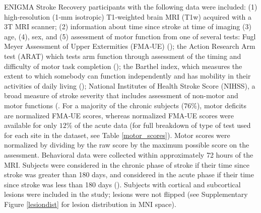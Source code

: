 \documentclass[10pt]{article}
\begin{document}
ENIGMA Stroke Recovery participants with the following data were included: (1) high‐resolution (1‐mm isotropic) T1‐weighted brain MRI (T1w) acquired with a 3T MRI scanner; (2) information about time since stroke at time of imaging (3) age, (4), sex, and (5) assessment of motor function from one of several tests: Fugl Meyer Assessment of Upper Extermities (FMA‐UE) (\cite{Gladstone2002-fw}); the Action Research Arm test (ARAT) which tests arm function through assessment of the timing and difficulty of motor task completion (\cite{Yozbatiran2008-xv}); the Barthel index, which measures the extent to which somebody can function independently and has mobility in their activities of daily living (\cite{Sulter1999-rr}); National Institutes of Health Stroke Score (NIHSS), a broad measure of stroke severity that includes assessment of non-motor and motor functions (\cite{Lyden2017-za}. For a majority of the chronic subjects (76$\%$), motor deficits are normalized FMA‐UE scores, whereas  normalized FMA‐UE scores were available for only $12\%$ of the acute data (for full breakdown of type of test used for each site in the dataset, see Table \ref{motor_scores}). Motor scores were normalized by dividing by the raw score by the maximum possible score on the assessment. Behavioral data were collected within approximately 72 hours of the MRI. Subjects were considered in the chronic phase of stroke if their time since stroke was greater than 180 days, and considered in the acute phase if their time since stroke was less than 180 days (\cite{Bernhardt2017-av}). Subjects with cortical and subcortical lesions were included in the study; lesions were not flipped (see Supplementary Figure \ref{lesiondist} for lesion distribution in MNI space). 
\end{document}

